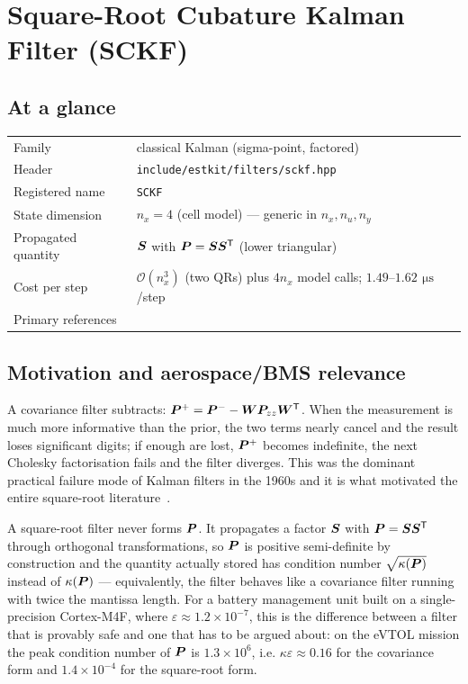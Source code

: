 \chapter{Square-Root Cubature Kalman Filter (SCKF)}
\label{ch:sckf}

\section*{At a glance}
\begin{tabular}{@{}l>{\raggedright\arraybackslash}p{}@{}}
Family & classical Kalman (sigma-point, factored) \\
Header & \texttt{include/estkit/filters/sckf.hpp} \\
Registered name & \texttt{SCKF} \\
State dimension & $n_x = 4$ (cell model) --- generic in $n_x, n_u, n_y$ \\
Propagated quantity & $\bm{S}$ with $\bm{P} = \bm{S}\bm{S}^{\mathsf{T}}$ (lower triangular) \\
Cost per step & $\mathcal{O}(n_x^3)$ (two QRs) plus $4n_x$ model calls; $1.49$--$1.62\,\SI{}{\micro\second}$/step \\
Primary references & \cite{arasaratnam2009ckf,kailath2000,kaminski1971,golubvanloan2013} \\
\end{tabular}

\section{Motivation and aerospace/BMS relevance}
A covariance filter subtracts: $\bm{P}^{+} = \bm{P}^{-} - \bm{W}\bm{P}_{zz}\bm{W}^{\mathsf{T}}$. When the measurement
is much more informative than the prior, the two terms nearly cancel and the result loses
significant digits; if enough are lost, $\bm{P}^{+}$ becomes indefinite, the next Cholesky
factorisation fails and the filter diverges. This was the dominant practical failure mode of
Kalman filters in the 1960s and it is what motivated the entire square-root
literature~\cite{kaminski1971}.

A square-root filter never forms $\bm{P}$. It propagates a factor $\bm{S}$ with $\bm{P} = \bm{S}\bm{S}^{\mathsf{T}}$
through orthogonal transformations, so $\bm{P}$ is positive semi-definite by construction and
the quantity actually stored has condition number $\sqrt{\kappa(\bm{P})}$ instead of
$\kappa(\bm{P})$ --- equivalently, the filter behaves like a covariance filter running with
twice the mantissa length. For a battery management unit built on a single-precision
Cortex-M4F, where $\varepsilon \approx 1.2\times10^{-7}$, this is the difference between a
filter that is provably safe and one that has to be argued about: on the eVTOL mission the
peak condition number of $\bm{P}$ is $1.3\times 10^6$, i.e. $\kappa\varepsilon \approx 0.16$ for
the covariance form and $1.4\times10^{-4}$ for the square-root form.

